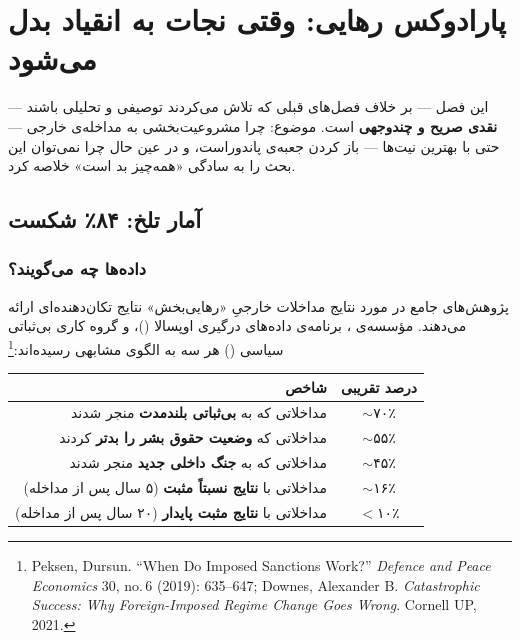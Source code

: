 \chapter{پارادوکس رهایی: وقتی نجات به انقیاد بدل می‌شود}
\label{ch:paradox-of-liberation}

\begin{tcolorbox}[mybox, title={درباره‌ی این فصل}]
این فصل — بر خلاف فصل‌های قبلی که تلاش می‌کردند توصیفی و تحلیلی باشند —
\textbf{نقدی صریح و چندوجهی} است. موضوع: چرا مشروعیت‌بخشی به مداخله‌ی خارجی
— حتی با بهترین نیت‌ها — باز کردن جعبه‌ی پاندوراست، و در عین حال چرا نمی‌توان
این بحث را به سادگی «همه‌چیز بد است» خلاصه کرد.
\end{tcolorbox}


\section{آمار تلخ: ۸۴٪ شکست}
\label{sec:ch15-failure-stats}

\subsection{داده‌ها چه می‌گویند؟}

پژوهش‌های جامع در مورد نتایج مداخلات خارجیِ «رهایی‌بخش» نتایج
تکان‌دهنده‌ای ارائه می‌دهند.  مؤسسه‌ی ، برنامه‌ی داده‌های
درگیری اوپسالا ()، و گروه کاری بی‌ثباتی سیاسی
() هر سه به الگوی مشابهی
رسیده‌اند:\footnote{Peksen, Dursun. ``When Do Imposed Sanctions Work?''
\textit{Defence and Peace Economics} 30, no.\,6 (2019): 635--647; Downes,
Alexander B. \textit{Catastrophic Success: Why Foreign-Imposed Regime
Change Goes Wrong}. Cornell UP, 2021.}

\begin{tcolorbox}[failbox, title={آمار شکست مداخلات رهایی‌بخش}]
\begin{table}[H]
\centering
\begin{tabular}{r|c}
\toprule
\textbf{شاخص} & \textbf{درصد تقریبی} \\
\midrule
مداخلاتی که به \textbf{بی‌ثباتی بلندمدت} منجر شدند & $\sim$۷۰٪ \\
مداخلاتی که \textbf{وضعیت حقوق بشر را بدتر} کردند & $\sim$۵۵٪ \\
مداخلاتی که به \textbf{جنگ داخلی جدید} منجر شدند & $\sim$۴۵٪ \\
مداخلاتی با \textbf{نتایج نسبتاً مثبت} (۵ سال پس از مداخله) & $\sim$۱۶٪ \\
مداخلاتی با \textbf{نتایج مثبت پایدار} (۲۰ سال پس از مداخله) & $<$۱۰٪ \\
\bottomrule
\end{tabular}
\end{table}
\end{tcolorbox}

